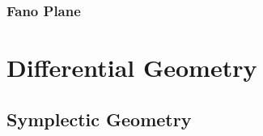 \subsubsection{Fano Plane}\label{sec:fano_plane}



\section{Differential Geometry}\label{sec:differential_geometry}

\subsection{Symplectic Geometry}\label{sec:symplectic_geometry}
